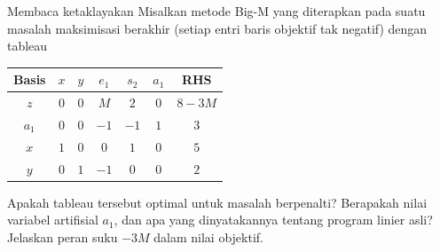 \begin{ex}{Membaca ketaklayakan}{}
\label{ex:tableau-infeasible}
 Misalkan metode Big-M yang diterapkan pada suatu masalah maksimisasi
berakhir (setiap entri baris objektif tak negatif) dengan tableau
\begin{center}
\renewcommand{\arraystretch}{1.3}\small\setlength{\tabcolsep}{4.5pt}
\begin{tabular}{c|ccccc|c}
\toprule
Basis & $x$ & $y$ & $e_1$ & $s_2$ & $a_1$ & RHS\\
\midrule
$z$   & $0$ & $0$ & $M$ & $2$ & $0$ & $8-3M$\\
\midrule
$a_1$ & $0$ & $0$ & $-1$ & $-1$ & $1$ & $3$\\
$x$   & $1$ & $0$ & $0$ & $1$ & $0$ & $5$\\
$y$   & $0$ & $1$ & $-1$ & $0$ & $0$ & $2$\\
\bottomrule
\end{tabular}
\end{center}
Apakah tableau tersebut optimal untuk masalah berpenalti? Berapakah nilai
variabel artifisial $a_1$, dan apa yang dinyatakannya tentang program linier
asli? Jelaskan peran suku $-3M$ dalam nilai objektif.
\exrefs{\S\ref{sec:tableau-bigm}}
\end{ex}


